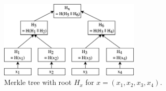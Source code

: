\documentclass{cacthesis}
\begin{document}
            \begin{figure}
            \begin{center}
              \includegraphics[width=0.6\textwidth]{images/merkle_tree_figure.png}
              \caption{Merkle tree with root $H_x$ for $x = (x_1, x_2, x_3, x_4)$.}
              \label{fig:merkleTreePrelims}
            \end{center}
            \end{figure}
        
\end{document}
